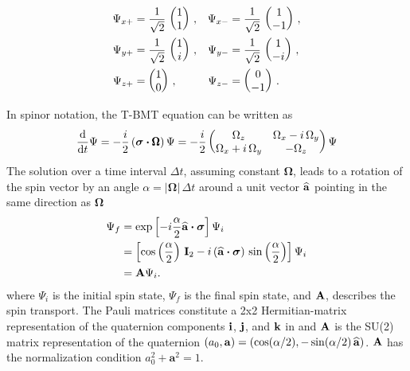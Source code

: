 \begin{align}
   \Psi_{x+} &= \frac{1}{\sqrt{2}} \, \begin{pmatrix} 1 \\ 1 \end{pmatrix} \, , 
  &\Psi_{x-} &= \frac{1}{\sqrt{2}} \, \begin{pmatrix} 1 \\ -1 \end{pmatrix} \, , \nonumber \\
   \Psi_{y+} &= \frac{1}{\sqrt{2}} \, \begin{pmatrix} 1 \\ i \end{pmatrix} \, , 
  &\Psi_{y-} &= \frac{1}{\sqrt{2}} \, \begin{pmatrix} 1 \\ -i \end{pmatrix} \, , \\
   \Psi_{z+} &=                       \begin{pmatrix} 1 \\ 0 \end{pmatrix} \, , 
  &\Psi_{z-} &=                       \begin{pmatrix} 0 \\ -1 \end{pmatrix} \, . \nonumber
\end{align}

In spinor notation, the T-BMT equation can be written as
  \begin{equation}   
    \frac{\mathrm{d}}{\mathrm{d} t} \Psi = - \frac{i}{2} \left( {\boldsymbol{\sigma}} \mathbin{\boldsymbol{\cdot}}   
    {\pmb\Omega} \right) \Psi = -\frac{i}{2} \begin{pmatrix}
    \Omega_z & \Omega_x - i \, \Omega_y \\
    \Omega_x + i \, \Omega_y & -\Omega_z \end{pmatrix}
    \Psi
    \label{tbmt-spinor}
  \end{equation}
The solution over a time interval $\Delta t$, assuming constant $\pmb\Omega$, leads to a rotation of
the spin vector by an angle $\alpha = |\pmb\Omega| \, \Delta t$ around a unit vector ${\widehat{\bf a}}$
pointing in the same direction as $\pmb\Omega$
  \begin{align}   
    \Psi_f &= \exp \left[ -i \frac{\alpha}{2} {\widehat{\bf a}} \mathbin{\boldsymbol{\cdot}} {\boldsymbol{\sigma}} \right] \Psi_i \nonumber \\
         &= \left[ \cos \left( \frac{\alpha}{2} \right) \, {\bf I}_{2} - 
            i \, ({\widehat{\bf a}} \mathbin{\boldsymbol{\cdot}} {\boldsymbol{\sigma}}) \, \sin \left( \frac{\alpha}{2} \right) \right] \Psi_i \\
         &= {\bf A} \Psi_i. \nonumber
  \end{align}   
where $\Psi_i$ is the initial spin state, $\Psi_f$ is the final spin state, and ${\bf A}$, describes
the spin transport. The Pauli matrices constitute a 2x2 Hermitian-matrix representation of the
quaternion components ${\bf i}$, ${\bf j}$, and ${\bf k}$ in  and ${\bf A}$ is the SU(2) matrix
representation of the quaternion $(a_0, {\bf a}) = (\cos(\alpha/2), -\sin(\alpha/2) \, {\widehat{\bf a}})$. ${\bf A}$ has the normalization condition $a_{0}^{2} + \boldsymbol{a}^{2} = 1$.

